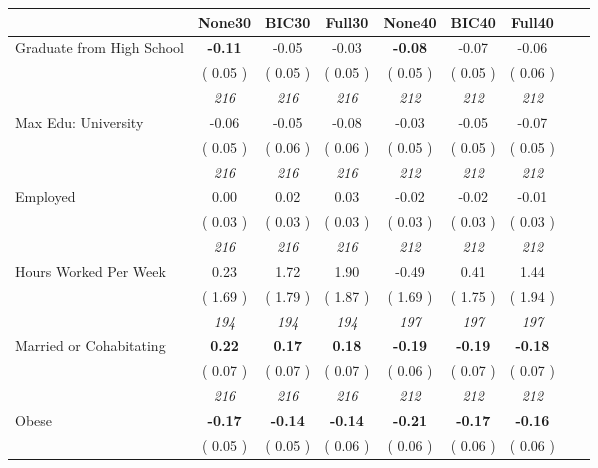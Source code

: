 \begin{tabular}{l c c c c c c c c}
\toprule
 & None30 & BIC30 & Full30 & None40 & BIC40 & Full40 \\
\midrule
Graduate from High School & \textbf{     -0.11 } &     -0.05 &     -0.03 & \textbf{     -0.08 } &     -0.07 &     -0.06 \\
& (     0.05 ) & (     0.05 ) & (     0.05 ) & (     0.05 ) & (     0.05 ) & (     0.06 ) \\
& \textit{ 216 } & \textit{ 216 } & \textit{ 216 } & \textit{ 212 } & \textit{ 212 } & \textit{ 212 } \\
Max Edu: University &     -0.06 &     -0.05 &     -0.08 &     -0.03 &     -0.05 &     -0.07 \\
& (     0.05 ) & (     0.06 ) & (     0.06 ) & (     0.05 ) & (     0.05 ) & (     0.05 ) \\
& \textit{ 216 } & \textit{ 216 } & \textit{ 216 } & \textit{ 212 } & \textit{ 212 } & \textit{ 212 } \\
Employed &      0.00 &      0.02 &      0.03 &     -0.02 &     -0.02 &     -0.01 \\
& (     0.03 ) & (     0.03 ) & (     0.03 ) & (     0.03 ) & (     0.03 ) & (     0.03 ) \\
& \textit{ 216 } & \textit{ 216 } & \textit{ 216 } & \textit{ 212 } & \textit{ 212 } & \textit{ 212 } \\
Hours Worked Per Week &      0.23 &      1.72 &      1.90 &     -0.49 &      0.41 &      1.44 \\
& (     1.69 ) & (     1.79 ) & (     1.87 ) & (     1.69 ) & (     1.75 ) & (     1.94 ) \\
& \textit{ 194 } & \textit{ 194 } & \textit{ 194 } & \textit{ 197 } & \textit{ 197 } & \textit{ 197 } \\
Married or Cohabitating & \textbf{      0.22 } & \textbf{      0.17 } & \textbf{      0.18 } & \textbf{     -0.19 } & \textbf{     -0.19 } & \textbf{     -0.18 } \\
& (     0.07 ) & (     0.07 ) & (     0.07 ) & (     0.06 ) & (     0.07 ) & (     0.07 ) \\
& \textit{ 216 } & \textit{ 216 } & \textit{ 216 } & \textit{ 212 } & \textit{ 212 } & \textit{ 212 } \\
Obese & \textbf{     -0.17 } & \textbf{     -0.14 } & \textbf{     -0.14 } & \textbf{     -0.21 } & \textbf{     -0.17 } & \textbf{     -0.16 } \\
& (     0.05 ) & (     0.05 ) & (     0.06 ) & (     0.06 ) & (     0.06 ) & (     0.06 ) \\

\end{tabular}
